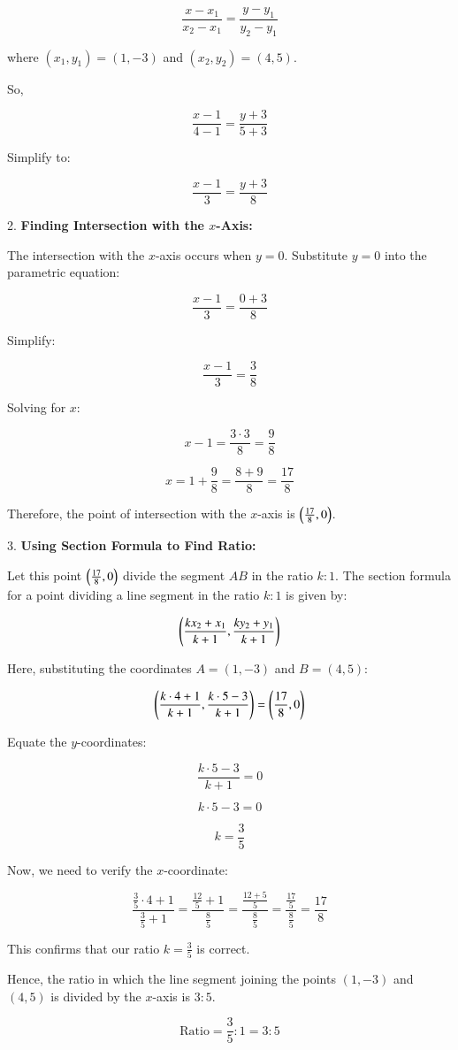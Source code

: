 \documentclass[journal]{IEEEtran}
\begin{document}
   $$\frac{x-x_1}{x_2-x_1}=\frac{y-y_1}{y_2-y_1}$$

   where $(x_1,y_1)=(1,-3)$ and $(x_2,y_2)=(4,5)$.

   So,

   $$\frac{x-1}{4-1}=\frac{y+3}{5+3}$$

   Simplify to:

   $$\frac{x-1}{3}=\frac{y+3}{8}$$

2. \textbf{Finding Intersection with the \( x \)-Axis:}

   The intersection with the $x$-axis occurs when $y=0$. Substitute $y=0$ into the parametric equation:

   $$\frac{x-1}{3}=\frac{0+3}{8}$$

   Simplify:

   $$\frac{x-1}{3}=\frac{3}{8}$$

   Solving for $x$:

   $$x-1=\frac{3 \cdot 3}{8}=\frac{9}{8}$$

   $$x=1+\frac{9}{8}=\frac{8+9}{8}=\frac{17}{8}$$

   Therefore, the point of intersection with the $x$-axis is $\left(\frac{17}{8}, 0\right)$.

3. \textbf{Using Section Formula to Find Ratio:}

   Let this point $\left(\frac{17}{8},0\right)$ divide the segment $AB$ in the ratio $k:1$. The section formula for a point dividing a line segment in the ratio $k:1$ is given by:

   $$\left(\frac{kx_2+x_1}{k+1},\frac{ky_2+y_1}{k+1}\right)$$

   Here, substituting the coordinates $A=(1,-3)$ and $B=(4,5)$:

   $$\left(\frac{k \cdot 4+1}{k+1},\frac{k \cdot 5-3}{k+1}\right)=\left(\frac{17}{8},0\right)$$

   Equate the $y$-coordinates:

   $$\frac{k \cdot 5-3}{k+1}=0$$

   $$k \cdot 5-3=0$$

   $$k=\frac{3}{5}$$

   Now, we need to verify the $x$-coordinate:

   $$\frac{\frac{3}{5} \cdot 4 + 1}{\frac{3}{5} + 1} = \frac{\frac{12}{5} + 1}{\frac{8}{5}} = \frac{\frac{12 + 5}{5}}{\frac{8}{5}} = \frac{\frac{17}{5}}{\frac{8}{5}} = \frac{17}{8}$$

   This confirms that our ratio $k=\frac{3}{5}$ is correct.

   Hence, the ratio in which the line segment joining the points $(1,-3)$ and $(4,5)$ is divided by the $x$-axis is $3:5$.

   $$\text{Ratio}=\frac{3}{5}:1=3:5$$
\end{document}
